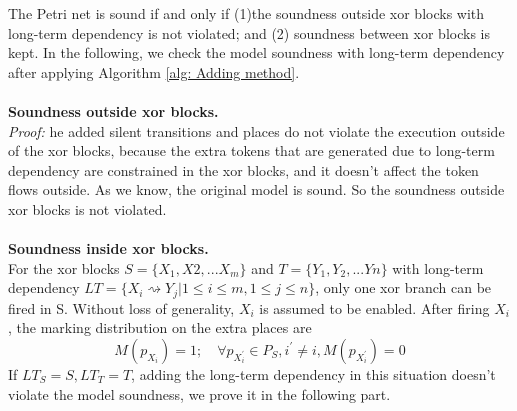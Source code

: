 The Petri net is sound if and only if (1)the soundness outside xor blocks with long-term dependency is not violated; and  (2) soundness between xor blocks is kept. In the following, we check the model soundness with long-term dependency after applying Algorithm \ref{alg: Adding method}. \\\\
\textbf{Soundness outside xor blocks.}\\
	\emph{Proof:} he added silent transitions and places do not violate the execution outside of the xor blocks, because the extra tokens that are generated due to long-term dependency are constrained in the xor blocks, and it doesn't affect the token flows outside. As we know, the original model is sound. So the soundness outside xor blocks is not violated.
\\\\
\textbf{Soundness inside xor blocks.}\\
For the xor blocks $S=\{X_1,X2,...X_m\}$ and $T=\{Y_1,Y_2,...Yn\}$ with long-term dependency $LT=\{X_i \rightsquigarrow Y_j \vert 1 \leq i \leq m, 1 \leq j \leq n \}$, only one xor branch can be fired in S. Without loss of generality, $X_i$ is assumed to be enabled. After firing $X_i$, the marking distribution on the extra places are  
\[ M(p_{X_i}) = 1; \quad 
\forall p_{X_i^\prime} \in P_S, i^\prime \neq i, M(p_{X_i^\prime})=0 \]
If $ LT_S = S, LT_T=T$, adding the long-term dependency in this situation doesn't violate the model soundness, we prove it in the following part.
